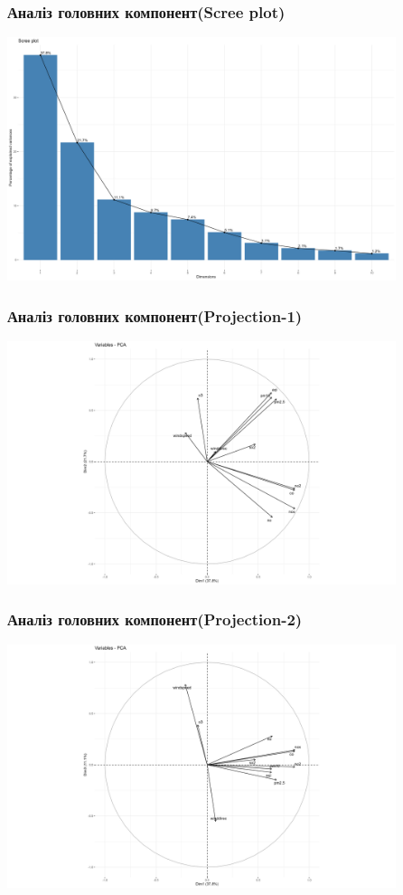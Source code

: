 \documentclass{beamer}
\begin{document}
\begin{frame}
\frametitle{Аналіз головних компонент(Scree plot)}
  \includegraphics[height=2.8in]{plots/lab4/pca/scree.png}
\end{frame}

\begin{frame}
\frametitle{Аналіз головних компонент(Projection-1)}
  \includegraphics[height=2.8in]{plots/lab4/pca/projection-1-2.png}
\end{frame}

\begin{frame}
\frametitle{Аналіз головних компонент(Projection-2)}
  \includegraphics[height=2.8in]{plots/lab4/pca/projection-1-3.png}
\end{frame}
\end{document}
